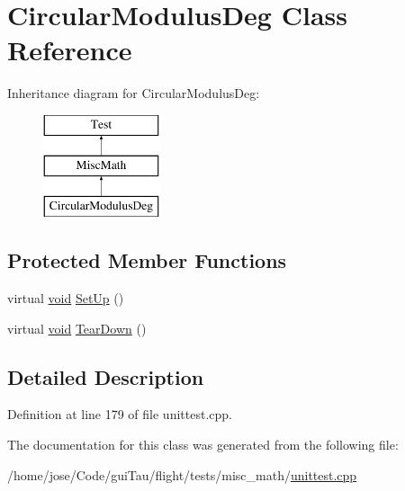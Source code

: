 \hypertarget{class_circular_modulus_deg}{\section{Circular\-Modulus\-Deg Class Reference}
\label{class_circular_modulus_deg}
}
Inheritance diagram for Circular\-Modulus\-Deg\-:\begin{figure}[H]
\begin{center}
\leavevmode
\includegraphics[height=3.000000cm]{class_circular_modulus_deg}
\end{center}
\end{figure}
\subsection*{Protected Member Functions}
\begin{DoxyCompactItemize}
\item 
virtual \hyperlink{group___n_a_m_e_ga18028b8badbf1ea7e704ccac3c488e82}{void} \hyperlink{group___unit_tests_gade916660611f66dc899b964b8d064166}{Set\-Up} ()
\item 
virtual \hyperlink{group___n_a_m_e_ga18028b8badbf1ea7e704ccac3c488e82}{void} \hyperlink{group___unit_tests_gab07ca9308f02057fa2623a51eb709aac}{Tear\-Down} ()
\end{DoxyCompactItemize}


\subsection{Detailed Description}


Definition at line 179 of file unittest.\-cpp.



The documentation for this class was generated from the following file\-:\begin{DoxyCompactItemize}
\item 
/home/jose/\-Code/gui\-Tau/flight/tests/misc\-\_\-math/\hyperlink{misc__math_2unittest_8cpp}{unittest.\-cpp}\end{DoxyCompactItemize}
